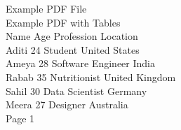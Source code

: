 \documentclass{article}
\begin{document}
Example PDF File\\
Example PDF with Tables\\
Name Age Profession Location\\
Aditi 24 Student United States\\
Ameya 28 Software Engineer India\\
Rabab 35 Nutritionist United Kingdom\\
Sahil 30 Data Scientist Germany\\
Meera 27 Designer Australia\\
Page 1\\
\end{document}
